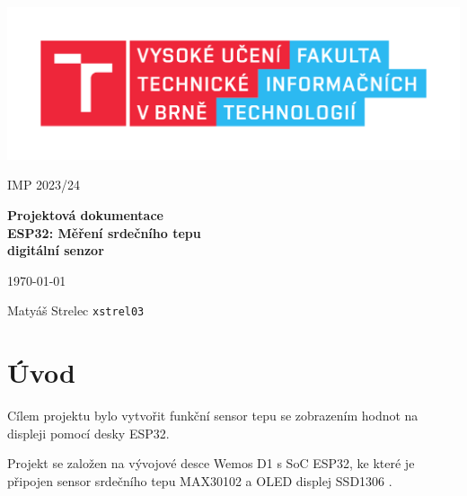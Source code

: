 \documentclass[11pt,a4paper]{article}
\begin{document}
\begin{titlepage}
	\begin{center}
		\includegraphics[scale=0.65]{img/fit.pdf} \\
				
		\vspace{2cm}
		
		\Large{
			IMP 2023/24
		}
						                
		\vspace{2cm}
\vspace{2cm}


  
		\huge{
			\textbf{
		Projektová dokumentace}}
		\vspace{2cm}
		\\
		      
		\huge{
			\textbf{
				ESP32: Měření srdečního tepu \\
				digitální senzor } \\}
				
							                
			\vspace{2cm}

			\Large{}
			\today{}
			
			\vspace{2cm}
			
			Matyáš Strelec \verb|xstrel03|
			\end{center}
			\end{titlepage}
			
        \pagebreak{}
			
        \tableofcontents
			
        \pagebreak{}

         \section{Úvod}

            Cílem projektu bylo vytvořit funkční sensor tepu se zobrazením hodnot na displeji pomocí desky ESP32.

            Projekt se založen na vývojové desce Wemos D1 s SoC ESP32, ke které je připojen sensor srdečního tepu MAX30102
            \cite{hwkitchen-max30102} a OLED displej SSD1306 \cite{hadex-ssd1306}.
\end{document}
